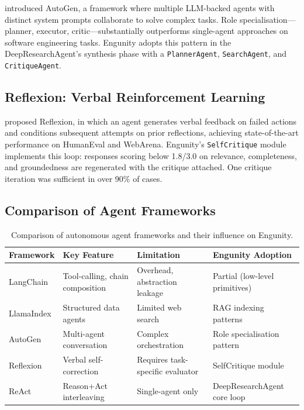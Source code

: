 \citet{wu2023autogen} introduced AutoGen, a framework where multiple LLM-backed agents with distinct system prompts collaborate to solve complex tasks. Role specialisation---planner, executor, critic---substantially outperforms single-agent approaches on software engineering tasks. Engunity adopts this pattern in the DeepResearchAgent's synthesis phase with a \texttt{PlannerAgent}, \texttt{SearchAgent}, and \texttt{CritiqueAgent}.

\subsection{Reflexion: Verbal Reinforcement Learning}
\label{subsec:reflexion}

\citet{shinn2023reflexion} proposed Reflexion, in which an agent generates verbal feedback on failed actions and conditions subsequent attempts on prior reflections, achieving state-of-the-art performance on HumanEval and WebArena. Engunity's \texttt{SelfCritique} module implements this loop: responses scoring below 1.8/3.0 on relevance, completeness, and groundedness are regenerated with the critique attached. One critique iteration was sufficient in over 90\% of cases.

\subsection{Comparison of Agent Frameworks}
\label{subsec:agent-comparison}

\begin{table}[ht]
    \centering
    \caption{Comparison of autonomous agent frameworks and their influence on Engunity.}
    \label{tab:agent-comparison}
    \renewcommand{\arraystretch}{1.3}
    \begin{tabular}{p{2.5cm} p{2.5cm} p{2.5cm} p{2.5cm}}
        \toprule
        \textbf{Framework} & \textbf{Key Feature} & \textbf{Limitation} & \textbf{Engunity Adoption} \\
        \midrule
        LangChain & Tool-calling, chain composition & Overhead, abstraction leakage & Partial (low-level primitives) \\
        LlamaIndex & Structured data agents & Limited web search & RAG indexing patterns \\
        AutoGen & Multi-agent conversation & Complex orchestration & Role specialisation pattern \\
        Reflexion & Verbal self-correction & Requires task-specific evaluator & SelfCritique module \\
        ReAct & Reason+Act interleaving & Single-agent only & DeepResearchAgent core loop \\
        \bottomrule
    \end{tabular}
\end{table}

